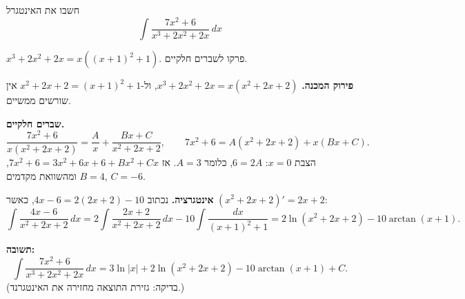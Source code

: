 
\begin{question}
חשבו את האינטגרל
\[ \int\frac{7x^2 + 6}{x^3 + 2x^2 + 2x}\,dx \]
\end{question}

\begin{hint}
$x^3 + 2x^2 + 2x = x\left((x+1)^2 + 1\right)$. פרקו לשברים חלקיים.
\end{hint}

\begin{solution}
\textbf{פירוק המכנה.} $x^3 + 2x^2 + 2x = x(x^2 + 2x + 2)$, ול-$x^2 + 2x + 2 = (x+1)^2 + 1$ אין שורשים ממשיים.

\textbf{שברים חלקיים.}
\[ \frac{7x^2 + 6}{x(x^2 + 2x + 2)} = \frac{A}{x} + \frac{Bx + C}{x^2 + 2x + 2}, \qquad 7x^2 + 6 = A(x^2 + 2x + 2) + x(Bx + C). \]
הצבת $x = 0$: $6 = 2A$, כלומר $A = 3$. אז $7x^2 + 6 = 3x^2 + 6x + 6 + Bx^2 + Cx$, ומהשוואת מקדמים $B = 4$, $C = -6$.

\textbf{אינטגרציה.} נכתוב $4x - 6 = 2(2x + 2) - 10$, כאשר $(x^2 + 2x + 2)' = 2x + 2$:
\[ \int\frac{4x - 6}{x^2 + 2x + 2}\,dx = 2\int\frac{2x+2}{x^2+2x+2}\,dx - 10\int\frac{dx}{(x+1)^2 + 1} = 2\ln(x^2 + 2x + 2) - 10\arctan(x + 1). \]

\textbf{תשובה:}
\[ \int\frac{7x^2 + 6}{x^3 + 2x^2 + 2x}\,dx = 3\ln|x| + 2\ln(x^2 + 2x + 2) - 10\arctan(x+1) + C. \]
(בדיקה: גזירת התוצאה מחזירה את האינטגרנד.)
\end{solution}

